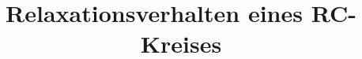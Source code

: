 

\subject{Versuch 353}
\title{Relaxationsverhalten eines RC-Kreises}


    \maketitle
    \thispagestyle{empty}
    \tableofcontents
    \newpage
    
    
    
    
    
    
    \printbibliography{}

